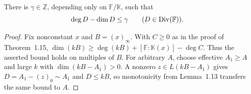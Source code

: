 \begin{theorem}
\label{par-thm-finite-genus}
\uses{}
There is $\gamma\in\mathbb Z$, depending only on $\mathbb F/\mathbb K$, such that
\[
\deg D-\dim D\leq\gamma\qquad(D\in\operatorname{Div}(\mathbb F)).
\]
\end{theorem}
\begin{proof}
Fix nonconstant $x$ and $B=(x)_\infty$. With $C\geq0$ as in the proof of
Theorem~1.15, $\dim(kB)\geq\deg(kB)+[\mathbb F:\mathbb K(x)]-\deg C$.
Thus the asserted bound holds on multiples of $B$. For arbitrary $A$, choose
effective $A_1\geq A$ and large $k$ with
$\dim(kB-A_1)>0$. A nonzero $z\in L(kB-A_1)$ gives
$D=A_1-(z)_0\sim A_1$ and $D\leq kB$, so monotonicity from Lemma~1.13 transfers
the same bound to $A$.
\end{proof}
